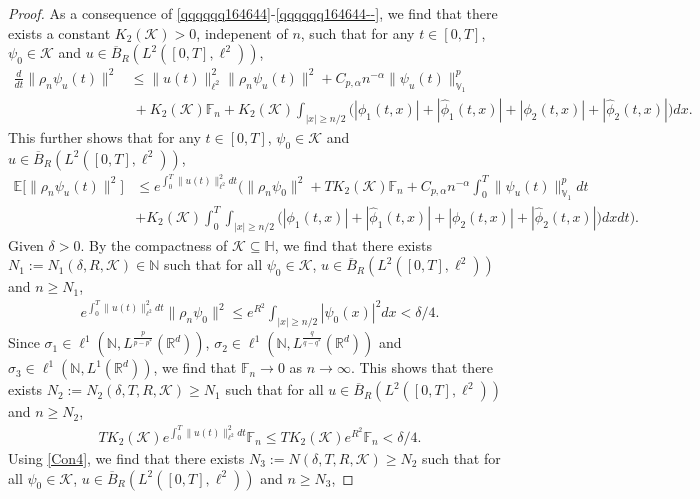 \documentclass[11pt]{article}
\renewcommand{\leq}{\leqslant}
\renewcommand{\geq}{\geqslant}  %
\numberwithin{equation}{section}
\begin{document}
\begin{proof}
As a consequence of \eqref{qqqqqq164644}-\eqref{qqqqqq164644--}, we find that there exists a constant $K_2(\mathcal{K})>0$, indepenent of $n$, such that
for any $t\in[0,T]$, $\psi_0\in\mathcal{K}$ and $u\in \overline{B}_{R}(L^2([0,T],\ell^2))$,
\begin{align}\label{qqqqqq164644---}	\frac{d}{dt}\|\rho_n\psi_u(t)
\|^2
&\leq\|u(t)\|^2_{\ell^2}\|\rho_n\psi_u(t)
\|^2+C_{p,\alpha}
n^{-\alpha}
\|\psi_u(t)\|^{p
}_{\mathbb{V}_1}
 \nonumber \\&\ +K_2(\mathcal{K})\mathbb{F}_n+
K_2(\mathcal{K})
\int_{|x|\geq n/2}
 \big(|\phi_1(t,x)|
 +|\widehat{\phi}_1(t,x)|+|\phi_2(t,x)|
 +|\widehat{\phi}_2(t,x)|
 \big)dx.
\end{align}
This further shows that for any $t\in[0,T]$, $\psi_0\in\mathcal{K}$ and $u\in \overline{B}_{R}(L^2([0,T],\ell^2))$,
\begin{align}\label{cutInt3}
 \mathbb{E}\Big[
\|\rho_n\psi_u(t)\|^{2}\Big]
&\leq e^{\int_0^T\|u(t)\|^2_{\ell^2}dt}
\bigg(\|\rho_n\psi_0\|^{2}+T
K_2(\mathcal{K})\mathbb{F}_n
+C_{p,\alpha}
n^{-\alpha}\int_0^T
\|\psi_u(t)\|^{p
}_{\mathbb{V}_1}dt
\nonumber \\&+K_2(\mathcal{K})\int_0^T
\int_{|x|\geq n/2}
 \big(|\phi_1(t,x)|
 +|\widehat{\phi}_1(t,x)|+|\phi_2(t,x)|
 +|\widehat{\phi}_2(t,x)|
 \big)dxdt\bigg).
\end{align}
Given $\delta>0$. By the compactness of $\mathcal{K}\subseteq \mathbb{H}$, we find that there exists $N_1:=N_1(\delta, R,\mathcal{K})\in\mathbb{N}$ such that for all $\psi_0\in\mathcal{K}$, $u\in \overline{B}_{R}(L^2([0,T],\ell^2))$ and $n\geq N_1$,
\begin{align}\label{cutInt4}
e^{\int_0^T\|u(t)\|^2_{\ell^2}dt}
\|\rho_n\psi_0\|^{2}
\leq e^{R^2}\int_{|x|\geq n/2}
|\psi_0(x)|^{2}dx<\delta/4.
\end{align}
Since $\sigma_1\in
 \ell^{1}
 (\mathbb{N},L^{\frac{p}{p-p^*}}(\mathbb{R}^d))$,
$\sigma_2
 \in
 \ell^{1}
 (\mathbb{N},L^{\frac{q}{q-q^*}}(\mathbb{R}^d))$ and
 $\sigma_3
 \in
 \ell^{1}
 (\mathbb{N},L^1(\mathbb{R}^d))$, we find that
 $\mathbb{F}_n\rightarrow0$ as $n\rightarrow\infty$. This shows that
 there exists $N_2:=N_2(\delta, T, R,\mathcal{K})\geq N_1$ such that for all $u\in \overline{B}_{R}(L^2([0,T],\ell^2))$ and $n\geq N_2$,
\begin{align}\label{cutInt4-}
TK_2(\mathcal{K})
e^{\int_0^T\|u(t)\|^2_{\ell^2}dt}
\mathbb{F}_n\leq
TK_2(\mathcal{K})e^{R^2}\mathbb{F}_n<\delta/4.
\end{align}
Using \eqref{Con4},
we find that there exists $N_3:=N(\delta,T,R,\mathcal{K})\geq N_2$ such that for all $\psi_0\in\mathcal{K}$, $u\in \overline{B}_{R}(L^2([0,T],\ell^2))$ and $n\geq N_3$,

\end{proof}
\end{document}
